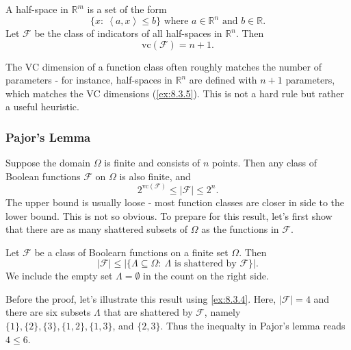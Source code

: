 \begin{example}
\label{ex:8.3.5}
A half-space in $\mathbb{R}^m$ is a set of the form 
\[ \{x: \ \left\langle a, x \right\rangle \leq b\} \text{ where } a \in \mathbb{R}^n \text{ and } b 
\in \mathbb{R}. \]
Let $\mathcal{F}$ be the class of indicators of all half-spaces in $\mathbb{R}^n$. Then 
\[ \mathrm{vc}(\mathcal{F}) = n + 1. \]
\end{example}

\begin{remark}
\label{rmk:8.3.6}
The VC dimension of a function class often roughly matches the number of parameters - for instance, half-spaces 
in $\mathbb{R}^n$ are defined with $n + 1$ parameters, which matches the VC dimensions (\cref{ex:8.3.5}). This 
is not a hard rule but rather a useful heuristic.
\end{remark}


\subsubsection{Pajor's Lemma}
Suppose the domain $\Omega$ is finite and consists of $n$ points. Then any class of Boolean functions 
$\mathcal{F}$ on $\Omega$ is also finite, and 
\[ 2^{\mathrm{vc}(\mathcal{F})} \leq |\mathcal{F}| \leq 2^n. \]
The upper bound is usually loose - most function classes are closer in side to the lower bound. This is not so 
obvious. To prepare for this result, let's first show that there are as many shattered subsets of $\Omega$ as 
the functions in $\mathcal{F}$.

\begin{lemma}
\label{lem:8.3.7}
Let $\mathcal{F}$ be a class of Boolearn functions on a finite set $\Omega$. Then 
\[ |\mathcal{F}| \leq |\{ \Lambda \subseteq \Omega: \ \Lambda \text{ is shattered by } \mathcal{F} \}|. \]
We include the empty set $\Lambda = \emptyset$ in the count on the right side.
\end{lemma}

Before the proof, let's illustrate this result using \cref{ex:8.3.4}. Here, $|\mathcal{F}| = 4$ and there are 
six subsets $\Lambda$ that are shattered by $\mathcal{F}$, namely $\{1\}, \{2\}, \{3\}, \{1, 2\}, \{1, 3\}$, 
and $\{2, 3\}$. Thus the inequalty in Pajor's lemma reads $4 \leq 6$.

